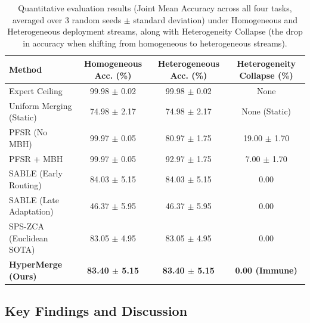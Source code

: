 \begin{table}[t]
\caption{Quantitative evaluation results (Joint Mean Accuracy across all four tasks, averaged over 3 random seeds $\pm$ standard deviation) under Homogeneous and Heterogeneous deployment streams, along with Heterogeneity Collapse (the drop in accuracy when shifting from homogeneous to heterogeneous streams).}
\label{tab:quantitative_results}
\vskip 0.15in
\begin{center}
\begin{small}
\begin{sc}
\begin{tabular}{lccc}
\toprule
Method & Homogeneous Acc. (\%) & Heterogeneous Acc. (\%) & Heterogeneity Collapse (\%) \\
\midrule
Expert Ceiling & 99.98 $\pm$ 0.02 & 99.98 $\pm$ 0.02 & None \\
Uniform Merging (Static) & 74.98 $\pm$ 2.17 & 74.98 $\pm$ 2.17 & None (Static) \\
PFSR (No MBH) & 99.97 $\pm$ 0.05 & 80.97 $\pm$ 1.75 & 19.00 $\pm$ 1.70 \\
PFSR + MBH & 99.97 $\pm$ 0.05 & 92.97 $\pm$ 1.75 & 7.00 $\pm$ 1.70 \\
SABLE (Early Routing) & 84.03 $\pm$ 5.15 & 84.03 $\pm$ 5.15 & 0.00 \\
SABLE (Late Adaptation) & 46.37 $\pm$ 5.95 & 46.37 $\pm$ 5.95 & 0.00 \\
SPS-ZCA (Euclidean SOTA) & 83.05 $\pm$ 4.95 & 83.05 $\pm$ 4.95 & 0.00 \\
\midrule
\textbf{HyperMerge (Ours)} & \textbf{83.40 $\pm$ 5.15} & \textbf{83.40 $\pm$ 5.15} & \textbf{0.00 (Immune)} \\
\bottomrule
\end{tabular}
\end{sc}
\end{small}
\end{center}
\vskip -0.1in
\end{table}

\subsection{Key Findings and Discussion}
\label{subsec:analysis}

